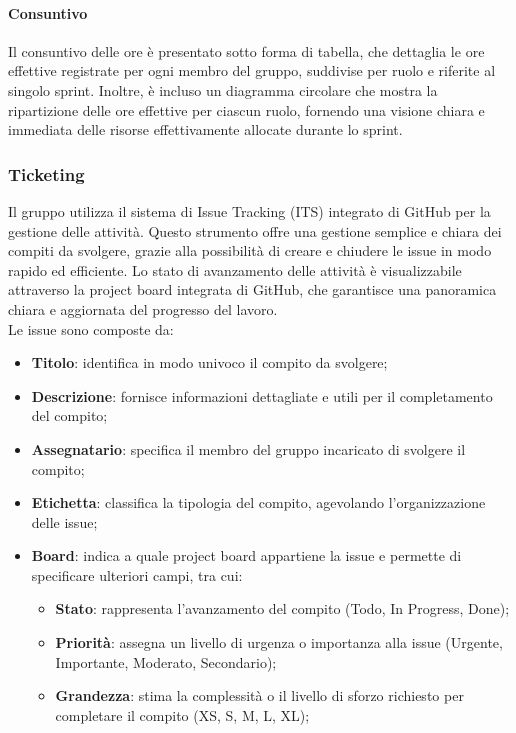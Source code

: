 \documentclass[10pt]{article}
\begin{document}
\begin{justify}
        \paragraph{Consuntivo}
        Il consuntivo delle ore è presentato sotto forma di tabella, che dettaglia le ore effettive registrate per ogni membro del gruppo, suddivise per ruolo e riferite al singolo sprint. Inoltre, è incluso un diagramma circolare che mostra la ripartizione delle ore effettive per ciascun ruolo, fornendo una visione chiara e immediata delle risorse effettivamente allocate durante lo sprint.

    \subsubsection{Ticketing}
    Il gruppo utilizza il sistema di Issue Tracking (ITS) integrato di GitHub per la gestione delle attività. Questo strumento offre una gestione semplice e chiara dei compiti da svolgere, grazie alla possibilità di creare e chiudere le issue in modo rapido ed efficiente. Lo stato di avanzamento delle attività è visualizzabile attraverso la project board integrata di GitHub, che garantisce una panoramica chiara e aggiornata del progresso del lavoro.\\
    Le issue sono composte da:
    \begin{itemize}
        \item \textbf{Titolo}: identifica in modo univoco il compito da svolgere;
        \item \textbf{Descrizione}: fornisce informazioni dettagliate e utili per il completamento del compito;
        \item \textbf{Assegnatario}: specifica il membro del gruppo incaricato di svolgere il compito;
        \item \textbf{Etichetta}: classifica la tipologia del compito, agevolando l'organizzazione delle issue;
        \item \textbf{Board}: indica a quale project board appartiene la issue e permette di specificare ulteriori campi, tra cui:
        \begin{itemize}
            \item \textbf{Stato}: rappresenta l'avanzamento del compito (Todo, In Progress, Done);
            \item \textbf{Priorità}: assegna un livello di urgenza o importanza alla issue (Urgente, Importante, Moderato, Secondario);
            \item \textbf{Grandezza}: stima la complessità o il livello di sforzo richiesto per completare il compito (XS, S, M, L, XL);

\end{itemize}
\end{itemize}
\end{justify}
\end{document}

